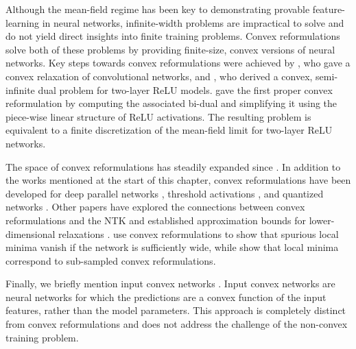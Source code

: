 Although the mean-field regime has been key to demonstrating provable
feature-learning in neural networks, infinite-width problems are impractical to
solve and do not yield direct insights into finite training problems.
Convex reformulations solve both of these problems by providing finite-size,
convex versions of neural networks.
Key steps towards convex reformulations were achieved by
\citet{bartan2019relaxations}, who gave a convex relaxation of convolutional
networks, and \citet{ergen2020convex}, who derived a convex, semi-infinite dual
problem for two-layer ReLU models.
\citet{pilanci2020convexnn} gave the first proper convex reformulation by
computing the associated bi-dual and simplifying it using the piece-wise
linear structure of ReLU activations.
The resulting problem is equivalent to a finite discretization of the
mean-field limit for two-layer ReLU networks.

The space of convex reformulations has steadily expanded since
\citet{pilanci2020convexnn}.
In addition to the works mentioned at the start of this chapter, convex
reformulations have been developed for deep parallel networks
\citep{ergen2021beyond, wang2023parallel}, threshold activations
\citep{ergen2023threshold}, and quantized networks \citep{bartan2021quantized}.
Other papers have explored the connections between convex reformulations and
the NTK \citep{dwaraknath2023ntk} and established approximation bounds
for lower-dimensional relaxations \citep{kim2024convex}.
\citet{lacotte2020hidden} use convex reformulations to show that spurious local
minima vanish if the network is sufficiently wide, while \citet{wang2022hidden}
show that local minima correspond to sub-sampled convex reformulations.

Finally, we briefly mention input convex networks
\citep{amos2017input, sivaprasad2021curious}.
Input convex networks are neural networks for which the predictions are a
convex function of the input features, rather than the model parameters.
This approach is completely distinct from convex reformulations and does not
address the challenge of the non-convex training problem.
